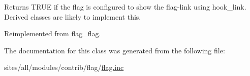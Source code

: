 Returns TRUE if the flag is configured to show the flag-link using hook\_\-link. Derived classes are likely to implement this. 

Reimplemented from \hyperlink{classflag__flag_10e87c5a12cc7b857d388985295bc8ab}{flag\_\-flag}.

The documentation for this class was generated from the following file:\begin{CompactItemize}
\item 
sites/all/modules/contrib/flag/\hyperlink{flag_8inc}{flag.inc}\end{CompactItemize}
